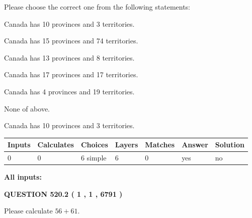 \documentclass[12pt]{article}
\begin{document}
  
Please choose the correct one from the following statements:
 
 
Canada has 10  provinces and 3 territories.
 
 
Canada has  15 provinces and  74 territories.
 
 
Canada has  13 provinces and  8 territories.
 
 
Canada has  17 provinces and  17 territories.
 
 
Canada has   4 provinces and  19 territories.
 
 
 None of above.
 
 
\noindent{}
 
 
Canada has 10  provinces and 3 territories.
 
 
\noindent{}
 
 
   
   
   
   
\noindent\begin{tabular}{|l|l|l|l|l|l|l|}
 \hline
Inputs & Calculates & Choices & Layers & Matches & Answer & Solution \\ \hline
 0  & 
 0  & 
 6
  simple  
  & 
 6  & 
 0  & 
  yes & 
  no 
  \\ \hline
 \end{tabular}
   
   
   
   
\noindent{}
   
   
   
   
\noindent\vspace{0.1in}\hspace{-0.08in} {\textbf{\Large{All inputs: }}}
   
   
  
\vspace{0.2in}
  
{\textbf{\Large{QUESTION
520.2 
 ( 1 , 1 , 6791 )
}}}
  
  
 
Please calculate $ %
56 +  %
61 $.
 
 
   
\end{document}
